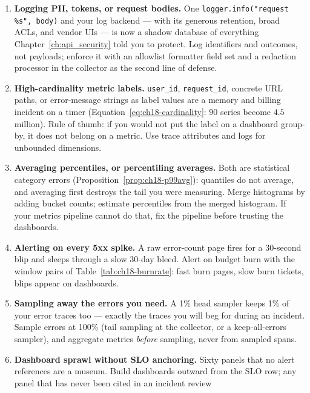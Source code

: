 \begin{enumerate}
  \item \textbf{Logging PII, tokens, or request bodies.} One
        \texttt{logger.info("request \%s", body)} and your log backend ---
        with its generous retention, broad ACLs, and vendor UIs --- is now
        a shadow database of everything Chapter~\ref{ch:api_security} told
        you to protect. Log identifiers and outcomes, not payloads; enforce
        it with an allowlist formatter field set and a redaction processor
        in the collector as the second line of defense.
  \item \textbf{High-cardinality metric labels.} \texttt{user\_id},
        \texttt{request\_id}, concrete URL paths, or error-message strings
        as label values are a memory and billing incident on a timer
        (Equation~\eqref{eq:ch18-cardinality}: $90$ series become $4.5$
        million). Rule of thumb: if you would not put the label on a
        dashboard group-by, it does not belong on a metric. Use trace
        attributes and logs for unbounded dimensions.
  \item \textbf{Averaging percentiles, or percentiling averages.} Both are
        statistical category errors (Proposition~\ref{prop:ch18-p99avg}):
        quantiles do not average, and averaging first destroys the tail you
        were measuring. Merge histograms by adding bucket counts; estimate
        percentiles from the merged histogram. If your metrics pipeline
        cannot do that, fix the pipeline before trusting the dashboards.
  \item \textbf{Alerting on every 5xx spike.} A raw error-count page fires
        for a 30-second blip and sleeps through a slow 30-day bleed.
        Alert on budget burn with the window pairs of
        Table~\ref{tab:ch18-burnrate}: fast burn pages, slow burn tickets,
        blips appear on dashboards.
  \item \textbf{Sampling away the errors you need.} A 1\% head sampler
        keeps 1\% of your error traces too --- exactly the traces you will
        beg for during an incident. Sample errors at 100\% (tail sampling
        at the collector, or a keep-all-errors sampler), and aggregate
        metrics \emph{before} sampling, never from sampled spans.
  \item \textbf{Dashboard sprawl without SLO anchoring.} Sixty panels that
        no alert references are a museum. Build dashboards outward from the
        SLO row; any panel that has never been cited in an incident review

\end{enumerate}
